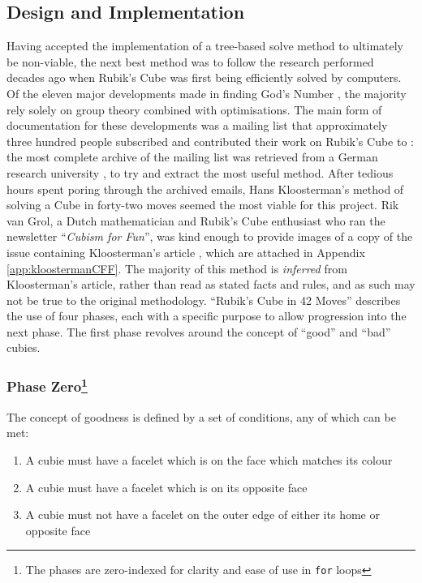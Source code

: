 \documentclass{report}
\newcommand{\tit}[1]{\textit{#1}}
\newcommand{\propernoun}[1]{\enquote{\tit{#1}}}
\begin{document}
	\subsection{Design and Implementation}
	
	Having accepted the implementation of a tree-based solve method to ultimately be non-viable, the next best method was to follow the research performed decades ago when Rubik's Cube was first being efficiently solved by computers. Of the eleven major developments made in finding God's Number \cite{Rokicki2010}, the majority rely solely on group theory combined with optimisations. The main form of documentation for these developments was a mailing list that approximately three hundred people subscribed and contributed their work on Rubik's Cube to \cite{Schoenert1996}: the most complete archive of the mailing list was retrieved from a German research university \cite{Schoenert1996}, \cite{RWTHAachenUniversity} to try and extract the most useful method. After tedious hours spent poring through the archived emails, Hans Kloosterman's method of solving a Cube in forty-two moves seemed the most viable for this project. Rik van Grol, a Dutch mathematician and Rubik's Cube enthusiast who ran the newsletter \propernoun{Cubism for Fun}, was kind enough to provide images of a copy of the issue containing Kloosterman's article \cite{Kloosterman1990}, which are attached in Appendix \ref{app:kloostermanCFF}.	The majority of this method is \tit{inferred} from Kloosterman's article, rather than read as stated facts and rules, and as such may not be true to the original methodology. \enquote{Rubik's Cube in 42 Moves} describes the use of four phases, each with a specific purpose to allow progression into the next phase. The first phase revolves around the concept of \enquote{good} and \enquote{bad} cubies. 
	
	\subsubsection[Phase Zero]{Phase Zero\protect\footnote{The phases are zero-indexed for clarity and ease of use in \lstinline|for| loops}}
	
	The concept of goodness is defined by a set of conditions, any of which can be met:
	
	\begin{enumerate}
		\item A cubie must have a facelet which is on the face which matches its colour
		\item A cubie must have a facelet which is on its opposite face
		\item A cubie must not have a facelet on the outer edge of either its home or opposite face
	\end{enumerate}
\end{document}
